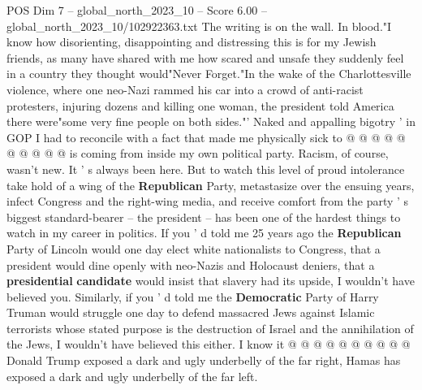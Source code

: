 \begin{textsample}{POS Dim 7 – global\_north\_2023\_10 – Score 6.00 – global\_north\_2023\_10/102922363.txt}
The writing is on the wall.
In blood."I know how disorienting, disappointing and distressing this is for my Jewish friends, as many have shared with me how scared and unsafe they suddenly feel in a country they thought would"Never Forget."In the wake of the Charlottesville violence, where one neo-Nazi rammed his car into a crowd of anti-racist protesters, injuring dozens and killing one woman, the president told America there were"some very fine people on both sides."' Naked and appalling bigotry ' in GOP I had to reconcile with a fact that made me physically sick to @ @ @ @ @ @ @ @ @ @ is coming from inside my own political party.
Racism, of course, wasn't new.
It ' s always been here.
But to watch this level of proud intolerance take hold of a wing of the \textbf{Republican} Party, metastasize over the ensuing years, infect Congress and the right-wing media, and receive comfort from the party ' s biggest standard-bearer -- the president -- has been one of the hardest things to watch in my career in politics.
If you ' d told me 25 years ago the \textbf{Republican} Party of Lincoln would one day elect white nationalists to Congress, that a president would dine openly with neo-Nazis and Holocaust deniers, that a \textbf{presidential} \textbf{candidate} would insist that slavery had its upside, I wouldn't have believed you.
Similarly, if you ' d told me the \textbf{Democratic} Party of Harry Truman would struggle one day to defend massacred Jews against Islamic terrorists whose stated purpose is the destruction of Israel and the annihilation of the Jews, I wouldn't have believed this either.
I know it @ @ @ @ @ @ @ @ @ @ Donald Trump exposed a dark and ugly underbelly of the far right, Hamas has exposed a dark and ugly underbelly of the far left.

\end{textsample}
